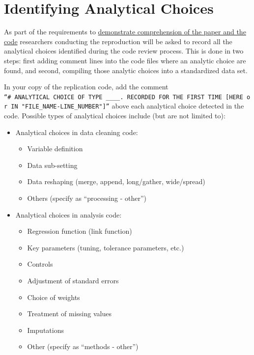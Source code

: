 \documentclass[]{book}
\providecommand{\tightlist}{%
  \setlength{\itemsep}{0pt}\setlength{\parskip}{0pt}}
\begin{document}
\hypertarget{id-analy}{%
\section{Identifying Analytical Choices}\label{id-analy}}

As part of the requirements to \href{requirements_comprehension.md}{demonstrate comprehension of the paper and the code} researchers conducting the reproduction will be asked to record all the analytical choices identified during the code review process. This is done in two steps: first adding comment lines into the code files where an analytic choice are found, and second, compiling those analytic choices into a standardized data set.

In your copy of the replication code, add the comment \texttt{“\#\ ANALYTICAL\ CHOICE\ OF\ TYPE\ \_\_\_\_.\ RECORDED\ FOR\ THE\ FIRST\ TIME\ {[}HERE\ or\ IN\ "FILE\_NAME-LINE\_NUMBER"{]}”} above each analytical choice detected in the code. Possible types of analytical choices include (but are not limited to):

\begin{itemize}
\tightlist
\item
  Analytical choices in data cleaning code:

  \begin{itemize}
  \tightlist
  \item
    Variable definition\\
  \item
    Data sub-setting\\
  \item
    Data reshaping (merge, append, long/gather, wide/spread)\\
  \item
    Others (specify as ``processing - other'')
  \end{itemize}
\item
  Analytical choices in analysis code:

  \begin{itemize}
  \tightlist
  \item
    Regression function (link function)\\
  \item
    Key parameters (tuning, tolerance parameters, etc.)\\
  \item
    Controls\\
  \item
    Adjustment of standard errors\\
  \item
    Choice of weights\\
  \item
    Treatment of missing values\\
  \item
    Imputations
  \item
    Other (specify as ``methods - other'')
  \end{itemize}
\end{itemize}
\end{document}
